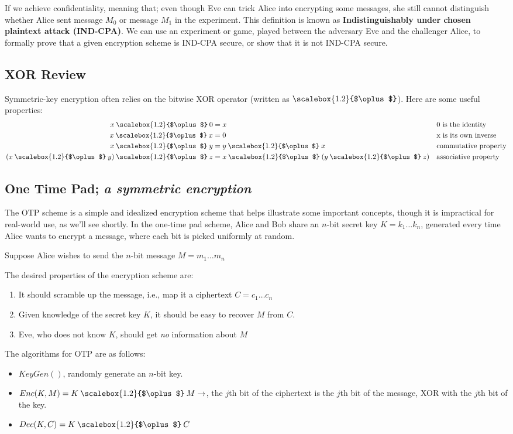 \documentclass{article}
\newcommand{\xor}{\mathbin{\text{\scalebox{1.2}{$\oplus$}}}} %
\begin{document}
If we achieve confidentiality, meaning that; even though Eve can trick Alice into encrypting some messages, she still cannot distinguish whether Alice sent message $M_0$ or message $M_1$ in the experiment. This definition is known as \textbf{Indistinguishably under chosen plaintext attack (IND-CPA)}. We can use an experiment or game, played between the adversary Eve and the challenger Alice, to formally prove that a given encryption scheme is IND-CPA secure, or show that it is not IND-CPA secure.


\subsection{XOR Review}
Symmetric-key encryption often relies on the bitwise XOR operator (written as $\xor$). Here are some useful properties:
\begin{align*}
    x \xor 0          & = x                 &  & \text{0 is the identity}    \\
    x \xor x          & = 0                 &  & \text{x is its own inverse} \\
    x \xor y          & = y \xor x          &  & \text{commutative property} \\
    (x \xor y) \xor z & = x \xor (y \xor z) &  & \text{associative property}
\end{align*}

\subsection{One Time Pad; \emph{a symmetric encryption}}
The OTP scheme is a simple and idealized encryption scheme that helps illustrate some important concepts, though it is impractical for real-world use, as we'll see shortly.
In the one-time pad scheme, Alice and Bob share an $n$-bit secret key $K = k_1 \dots k_n$, generated every time Alice wants to encrypt a message, where each bit is picked uniformly at random.

Suppose Alice wishes to send the $n$-bit message $M= m_1\dots m_n$

The desired properties of the encryption scheme are:
\begin{enumerate}
    \item It should scramble up the message, i.e., map it a ciphertext $C = c_1 \dots c_n$
    \item Given knowledge of the secret key $K$, it should be easy to recover $M$ from $C$.
    \item Eve, who does not know $K$, should get \emph{no} information about $M$
\end{enumerate}
The algorithms for OTP are as follows:
\begin{itemize}
    \item $KeyGen()$, randomly generate an $n$-bit key.
    \item $Enc(K, M) = K \xor M \rightarrow$, the $j$th bit of the ciphertext is the $j$th bit of the message, XOR with the $j$th bit of the key.
    \item $Dec(K, C) = K \xor C$
\end{itemize}
\end{document}
